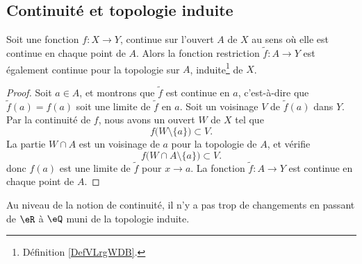 \subsection{Continuité et topologie induite}
\begin{proposition}     \label{PROPooNPLBooPfmmym}
	Soit une fonction \( f\colon X\to Y\), continue sur l'ouvert \( A\) de \( X\) au sens où elle est continue en chaque point de \( A\). Alors la fonction restriction \( \tilde f\colon A\to Y\) est également continue pour la topologie sur \( A\), induite\footnote{Définition \ref{DefVLrgWDB}.} de \( X\).
\end{proposition}

\begin{proof}
	Soit \( a\in A\), et montrons que \( \tilde f\) est continue en \( a\), c'est-à-dire que \( \tilde f(a)=f(a)\) soit une limite de \( \tilde f\) en \( a\). Soit un voisinage \( V\) de \( \tilde f(a)\) dans \( Y\). Par la continuité de \( f\), nous avons un ouvert \( W\) de \( X\) tel que
	\begin{equation}
		f\big( W\setminus\{ a \} \big)\subset V.
	\end{equation}
	La partie \( W\cap A\) est un voisinage de \( a\) pour la topologie de \( A\), et vérifie
	\begin{equation}
		f\big( W\cap A\setminus\{ a \} \big)\subset V.
	\end{equation}
	donc \( f(a)\) est une limite de \( \tilde f\) pour \( x\to a\). La fonction \( \tilde f\colon A\to Y\) est continue en chaque point de \( A\).
\end{proof}

Au niveau de la notion de continuité, il n'y a pas trop de changements en passant de \( \eR\) à \( \eQ\) muni de la topologie induite.

